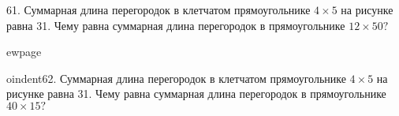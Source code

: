 61. Суммарная длина перегородок в клетчатом прямоугольнике $4\times5$ на рисунке равна 31. Чему равна суммарная длина перегородок в прямоугольнике $12\times50?$
\begin{center}
\begin{figure}[ht!]
\end{figure}
\end{center}

ewpage

oindent62. Суммарная длина перегородок в клетчатом прямоугольнике $4\times5$ на рисунке равна 31. Чему равна суммарная длина перегородок в прямоугольнике $40\times15?$
\begin{center}
\begin{figure}[ht!]
\end{figure}
\end{center}
